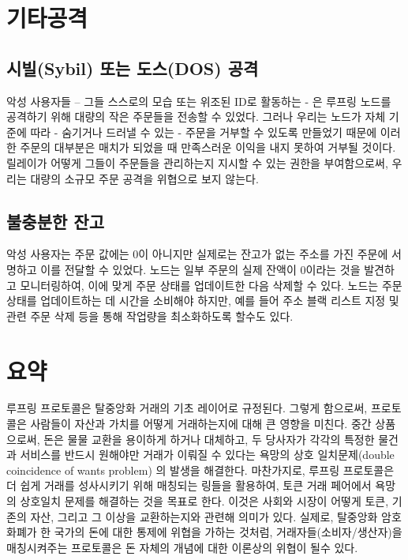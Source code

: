 \documentclass{article}
\begin{document}
\begin{multicols}{2}
\section{기타공격}

\subsection{시빌(Sybil) 또는 도스(DOS) 공격}
악성 사용자들 – 그들 스스로의 모습 또는 위조된 ID로 활동하는 - 은 루프링 노드를 공격하기 위해 대량의 작은 주문들을 전송할 수 있었다. 그러나 우리는 노드가 자체 기준에 따라 - 숨기거나 드러낼 수 있는 - 주문을 거부할 수 있도록 만들었기 때문에 이러한 주문의 대부분은 매치가 되었을 때 만족스러운 이익을 내지 못하여 거부될 것이다. 릴레이가 어떻게 그들이 주문들을 관리하는지 지시할 수 있는 권한을 부여함으로써, 우리는 대량의 소규모 주문 공격을 위협으로 보지 않는다.

\subsection{불충분한 잔고}
악성 사용자는 주문 값에는 0이 아니지만 실제로는 잔고가 없는 주소를 가진 주문에 서명하고 이를 전달할 수 있었다. 노드는 일부 주문의 실제 잔액이 0이라는 것을 발견하고 모니터링하여, 이에 맞게 주문 상태를 업데이트한 다음 삭제할 수 있다. 노드는 주문 상태를 업데이트하는 데 시간을 소비해야 하지만, 예를 들어 주소 블랙 리스트 지정 및 관련 주문 삭제 등을 통해 작업량을 최소화하도록 할수도 있다.



\section{요약}
루프링 프로토콜은 탈중앙화 거래의 기초 레이어로 규정된다. 그렇게 함으로써, 프로토콜은 사람들이 자산과 가치를 어떻게 거래하는지에 대해 큰 영향을 미친다. 중간 상품으로써, 돈은 물물 교환을 용이하게 하거나 대체하고, 두 당사자가 각각의 특정한 물건과 서비스를 반드시 원해야만 거래가 이뤄질 수 있다는 욕망의 상호 일치문제(double coincidence of wants problem) \cite{unenumerated2006}의 발생을 해결한다. 마찬가지로, 루프링 프로토콜은 더 쉽게 거래를 성사시키기 위해 매칭되는 링들을 활용하여, 토큰 거래 페어에서 욕망의 상호일치 문제를 해결하는 것을 목표로 한다. 이것은 사회와 시장이 어떻게 토큰, 기존의 자산, 그리고 그 이상을 교환하는지와 관련해 의미가 있다. 실제로, 탈중앙화 암호 화폐가 한 국가의 돈에 대한 통제에 위협을 가하는 것처럼, 거래자들(소비자/생산자)을 매칭시켜주는 프로토콜은 돈 자체의 개념에 대한 이론상의 위협이 될수 있다.


\end{multicols}
\end{document}
